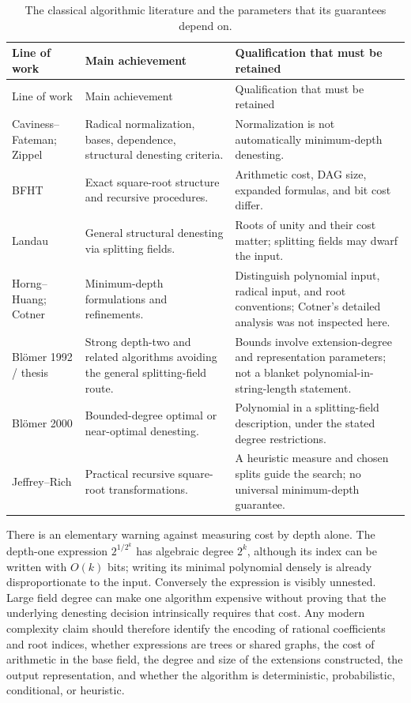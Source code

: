 \documentclass[11pt,oneside]{article}
\numberwithin{equation}{section}
\theoremstyle{definition}
\theoremstyle{remark}
\begin{document}
\begin{longtable}{@{}p{}p{}p{}@{}}
\caption{The classical algorithmic literature and the parameters that its guarantees depend on.}\label{tab:complexity}\\
\toprule
Line of work & Main achievement & Qualification that must be retained\\
\midrule\endfirsthead
\toprule Line of work & Main achievement & Qualification that must be retained\\\midrule\endhead
\bottomrule\endfoot
Caviness--Fateman; Zippel & Radical normalization, bases, dependence, structural denesting criteria. & Normalization is not automatically minimum-depth denesting.\\[4pt]
BFHT & Exact square-root structure and recursive procedures. & Arithmetic cost, DAG size, expanded formulas, and bit cost differ.\\[4pt]
Landau & General structural denesting via splitting fields. & Roots of unity and their cost matter; splitting fields may dwarf the input.\\[4pt]
Horng--Huang; Cotner & Minimum-depth formulations and refinements. & Distinguish polynomial input, radical input, and root conventions; Cotner's detailed analysis was not inspected here.\\[4pt]
Bl\"omer 1992 / thesis & Strong depth-two and related algorithms avoiding the general splitting-field route. & Bounds involve extension-degree and representation parameters; not a blanket polynomial-in-string-length statement.\\[4pt]
Bl\"omer 2000 & Bounded-degree optimal or near-optimal denesting. & Polynomial in a splitting-field description, under the stated degree restrictions.\\[4pt]
Jeffrey--Rich & Practical recursive square-root transformations. & A heuristic measure and chosen splits guide the search; no universal minimum-depth guarantee.\\
\end{longtable}

There is an elementary warning against measuring cost by depth alone. The depth-one expression $2^{1/2^k}$ has algebraic degree $2^k$, although its index can be written with $O(k)$ bits; writing its minimal polynomial densely is already disproportionate to the input. Conversely the expression is visibly unnested. Large field degree can make one algorithm expensive without proving that the underlying denesting decision intrinsically requires that cost. Any modern complexity claim should therefore identify the encoding of rational coefficients and root indices, whether expressions are trees or shared graphs, the cost of arithmetic in the base field, the degree and size of the extensions constructed, the output representation, and whether the algorithm is deterministic, probabilistic, conditional, or heuristic.
\end{document}
